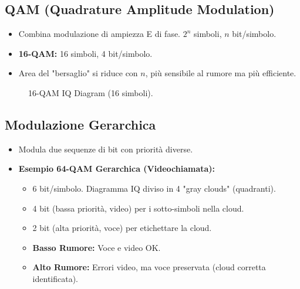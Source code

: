 \subsection{QAM (Quadrature Amplitude Modulation)}
\begin{itemize}
    \item Combina modulazione di ampiezza E di fase. $2^n$ simboli, $n$ bit/simbolo.
    \item \textbf{16-QAM:} 16 simboli, 4 bit/simbolo.
    \item Area del "bersaglio" si riduce con $n$, più sensibile al rumore ma più efficiente.
\end{itemize}
\begin{figure}[H] \centering
{} \caption{16-QAM IQ Diagram (16 simboli).} \end{figure}

\subsection{Modulazione Gerarchica}
\begin{itemize}
    \item Modula due sequenze di bit con priorità diverse.
    \item \textbf{Esempio 64-QAM Gerarchica (Videochiamata):}
    \begin{itemize}
        \item 6 bit/simbolo. Diagramma IQ diviso in 4 "gray clouds" (quadranti).
        \item 4 bit (bassa priorità, video) per i sotto-simboli nella cloud.
        \item 2 bit (alta priorità, voce) per etichettare la cloud.
        \item \textbf{Basso Rumore:} Voce e video OK.
        \item \textbf{Alto Rumore:} Errori video, ma voce preservata (cloud corretta identificata).
    \end{itemize}
\end{itemize}

